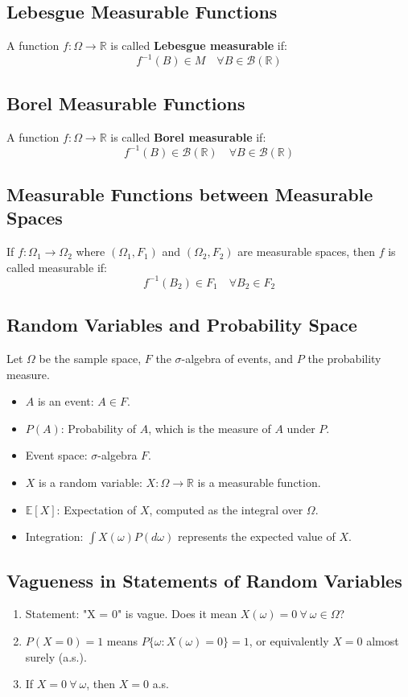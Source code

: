\documentclass{article}
\begin{document}
\subsection{Lebesgue Measurable Functions}
A function $f : \Omega \to \mathbb{R}$ is called \textbf{Lebesgue measurable} if:
\[f^{-1}(B) \in M \quad \forall B \in \mathcal{B}(\mathbb{R})\]

\subsection{Borel Measurable Functions}
A function $f : \Omega \to \mathbb{R}$ is called \textbf{Borel measurable} if:
\[f^{-1}(B) \in \mathcal{B}(\mathbb{R}) \quad \forall B \in \mathcal{B}(\mathbb{R})\]

\subsection{Measurable Functions between Measurable Spaces}
If $f : \Omega_1 \to \Omega_2$ where $(\Omega_1, F_1)$ and $(\Omega_2, F_2)$ are measurable spaces, then $f$ is called measurable if:
\[f^{-1}(B_2) \in F_1 \quad \forall B_2 \in F_2\]

\subsection{Random Variables and Probability Space}
Let $\Omega$ be the sample space, $F$ the $\sigma$-algebra of events, and $P$ the probability measure.
\begin{itemize}
    \item $A$ is an event: $A \in F$.
    \item $P(A)$: Probability of $A$, which is the measure of $A$ under $P$.
    \item Event space: $\sigma$-algebra $F$.
    \item $X$ is a random variable: $X : \Omega \to \mathbb{R}$ is a measurable function.
    \item $\mathbb{E}[X]$: Expectation of $X$, computed as the integral over $\Omega$.
    \item Integration: $\int X(\omega) P(d\omega)$ represents the expected value of $X$.
\end{itemize}

\subsection{Vagueness in Statements of Random Variables}
\begin{enumerate}
    \item Statement: "X = 0" is vague. Does it mean $X(\omega) = 0 \ \forall \ \omega \in \Omega$?
    \item $P(X = 0) = 1$ means $P\{\omega : X(\omega) = 0\} = 1$, or equivalently $X = 0$ almost surely (a.s.).
    \item If $X = 0 \ \forall \ \omega$, then $X = 0$ a.s.
\end{enumerate}
\end{document}
